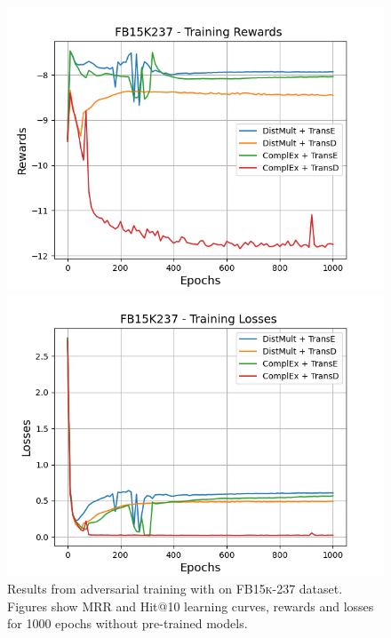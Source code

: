 \begin{figure}[H]
    \begin{minipage}{.45\textwidth}
      \centering
      \includegraphics[width=0.9\linewidth]{figures/results/gan_train/not_pretrained/uncertainty/max/entropy/fb15k237/1k_epochs/uncertainty_fb15k237_rew.png}
    \end{minipage}%
     \begin{minipage}{.45\textwidth}
      \centering
      \includegraphics[width=0.9\linewidth]{figures/results/gan_train/not_pretrained/uncertainty/max/entropy/fb15k237/1k_epochs/uncertainty_fb15k237_losses.png}
    \end{minipage}%
    \caption{Results from adversarial training with \usmax on \textsc{FB15k-237} dataset.
    Figures show MRR and Hit@10 learning curves, rewards and losses for 1000 epochs without pre-trained models.}
    \label{fig:gan_train_not_pretrained_usmax_fb15k237}
\end{figure}
